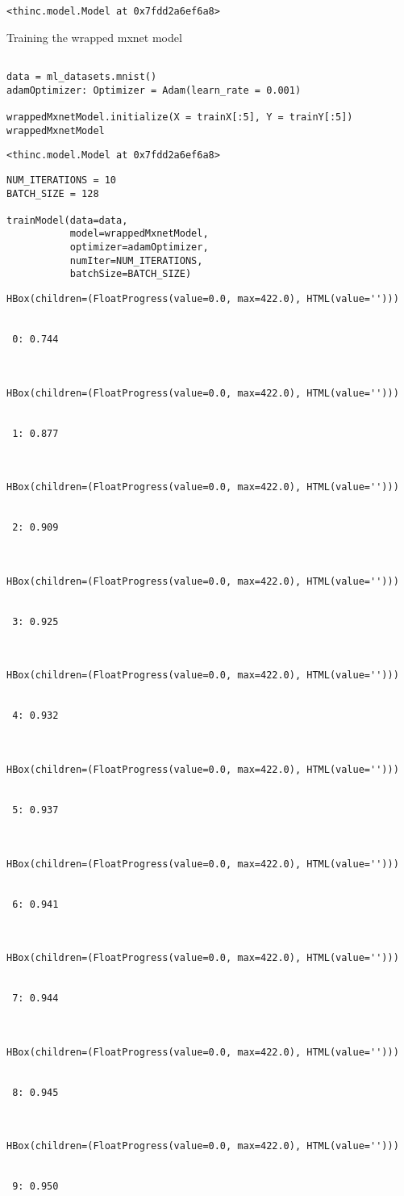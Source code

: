 \documentclass[
]{article}
\begin{document}
\begin{verbatim}
<thinc.model.Model at 0x7fdd2a6ef6a8>
\end{verbatim}

Training the wrapped mxnet model

\begin{verbatim}

data = ml_datasets.mnist()
adamOptimizer: Optimizer = Adam(learn_rate = 0.001)

wrappedMxnetModel.initialize(X = trainX[:5], Y = trainY[:5])
wrappedMxnetModel
\end{verbatim}

\begin{verbatim}
<thinc.model.Model at 0x7fdd2a6ef6a8>
\end{verbatim}

\begin{verbatim}
NUM_ITERATIONS = 10
BATCH_SIZE = 128

trainModel(data=data,
           model=wrappedMxnetModel,
           optimizer=adamOptimizer,
           numIter=NUM_ITERATIONS,
           batchSize=BATCH_SIZE)
\end{verbatim}

\begin{verbatim}
HBox(children=(FloatProgress(value=0.0, max=422.0), HTML(value='')))


 0: 0.744



HBox(children=(FloatProgress(value=0.0, max=422.0), HTML(value='')))


 1: 0.877



HBox(children=(FloatProgress(value=0.0, max=422.0), HTML(value='')))


 2: 0.909



HBox(children=(FloatProgress(value=0.0, max=422.0), HTML(value='')))


 3: 0.925



HBox(children=(FloatProgress(value=0.0, max=422.0), HTML(value='')))


 4: 0.932



HBox(children=(FloatProgress(value=0.0, max=422.0), HTML(value='')))


 5: 0.937



HBox(children=(FloatProgress(value=0.0, max=422.0), HTML(value='')))


 6: 0.941



HBox(children=(FloatProgress(value=0.0, max=422.0), HTML(value='')))


 7: 0.944



HBox(children=(FloatProgress(value=0.0, max=422.0), HTML(value='')))


 8: 0.945



HBox(children=(FloatProgress(value=0.0, max=422.0), HTML(value='')))


 9: 0.950
\end{verbatim}
\end{document}
